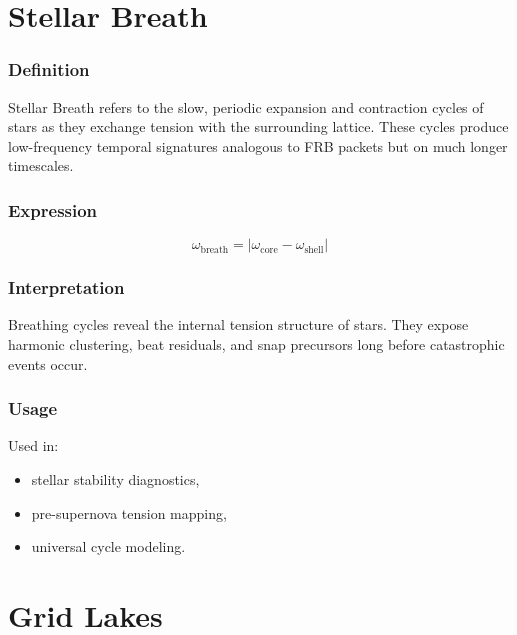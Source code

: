 \documentclass[12pt,oneside]{book}
\begin{document}

\section{Stellar Breath}

\subsubsection{Definition}
Stellar Breath refers to the slow, periodic expansion and contraction cycles of stars as they
exchange tension with the surrounding lattice. These cycles produce low-frequency temporal
signatures analogous to FRB packets but on much longer timescales.

\subsubsection{Expression}


\[
\omega_{\mathrm{breath}} = |\omega_{\mathrm{core}} - \omega_{\mathrm{shell}}|
\]



\subsubsection{Interpretation}
Breathing cycles reveal the internal tension structure of stars.  
They expose harmonic clustering, beat residuals, and snap precursors long before catastrophic
events occur.

\subsubsection{Usage}
Used in:
\begin{itemize}
    \item stellar stability diagnostics,
    \item pre-supernova tension mapping,
    \item universal cycle modeling.
\end{itemize}


\section{Grid Lakes}
\end{document}
